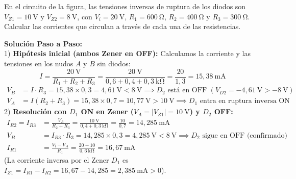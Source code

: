 \begin{ejercicio}
En el circuito de la figura, las tensiones inversas de ruptura de los diodos son $V_{Z1} = 10\ \si{\volt}$ y $V_{Z2} = 8\ \si{\volt}$, con $V_i = 20\ \si{\volt}$, $R_1 = 600\ \si{\ohm}$, $R_2 = 400\ \si{\ohm}$ y $R_3 = 300\ \si{\ohm}$. Calcular las corrientes que circulan a través de cada una de las resistencias.
\tcbline
\begin{center}
\end{center}
\textbf{Solución Paso a Paso:}\\[4pt]
1) \textbf{Hipótesis inicial (ambos Zener en OFF):}
Calculamos la corriente y las tensiones en los nudos $A$ y $B$ sin diodos:
\begin{equation}
    I = \frac{20\ \si{\volt}}{R_1 + R_2 + R_3} = \frac{20\ \si{\volt}}{0{,}6 + 0{,}4 + 0{,}3\ \si{\kilo\ohm}} = \frac{20}{1{,}3} = 15{,}38\ \si{\milli\ampere}
\end{equation}
\begin{align}
    V_B &= I \cdot R_3 = 15{,}38 \times 0{,}3 = 4{,}61\ \si{\volt} < 8\ \si{\volt} \implies D_2\text{ está en OFF } (V_{D2} = -4{,}61\ \si{\volt} > -8\ \si{\volt}) \\
    V_A &= I (R_2 + R_3) = 15{,}38 \times 0{,}7 = 10{,}77\ \si{\volt} > 10\ \si{\volt} \implies D_1\text{ entra en ruptura inversa ON}
\end{align}
2) \textbf{Resolución con $D_1$ ON en Zener ($V_A = |V_{Z1}| = 10\ \si{\volt}$) y $D_2$ OFF:}
\begin{align}
    I_{R2} = I_{R3} &= \frac{V_A}{R_2 + R_3} = \frac{10\ \si{\volt}}{0{,}4 + 0{,}3\ \si{\kilo\ohm}} = \frac{10}{0{,}7} = 14{,}285\ \si{\milli\ampere} \\
    V_B &= I_{R3} \cdot R_3 = 14{,}285 \times 0{,}3 = 4{,}285\ \si{\volt} < 8\ \si{\volt} \implies D_2\text{ sigue en OFF (confirmado)} \\
    I_{R1} &= \frac{V_i - V_A}{R_1} = \frac{20 - 10}{0{,}6\ \si{\kilo\ohm}} = 16{,}67\ \si{\milli\ampere}
\end{align}
(La corriente inversa por el Zener $D_1$ es $I_{Z1} = I_{R1} - I_{R2} = 16{,}67 - 14{,}285 = 2{,}385\ \si{\milli\ampere} > 0$).
\end{ejercicio}


